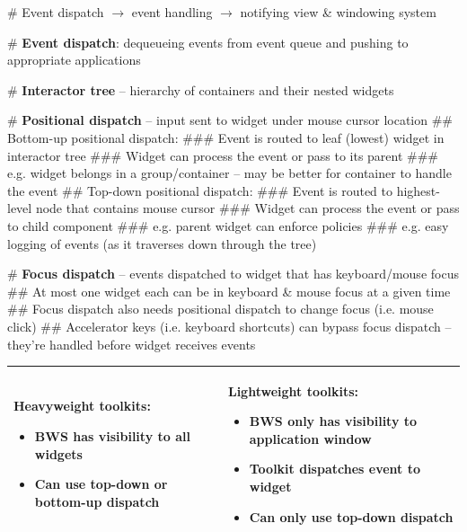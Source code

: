 \documentclass[11pt, oneside]{article}
\newenvironment{itemized}{\begin{itemize}[noitemsep, topsep=0pt, leftmargin=*]}{\end{itemize}}  %
\begin{document}
# Event dispatch $\rightarrow$ event handling $\rightarrow$ notifying view \& windowing system

# \textbf{Event dispatch}: dequeueing events from event queue and pushing to appropriate applications

# \textbf{Interactor tree} -- hierarchy of containers and their nested widgets

# \textbf{Positional dispatch} -- input sent to widget under mouse cursor location
## Bottom-up positional dispatch:
### Event is routed to leaf (lowest) widget in interactor tree
### Widget can process the event or pass to its parent
### e.g. widget belongs in a group/container -- may be better for container to handle the event
## Top-down positional dispatch:
### Event is routed to highest-level node that contains mouse cursor
### Widget can process the event or pass to child component
### e.g. parent widget can enforce policies
### e.g. easy logging of events (as it traverses down through the tree)

# \textbf{Focus dispatch} -- events dispatched to widget that has keyboard/mouse focus
## At most one widget each can be in keyboard \& mouse focus at a given time
## Focus dispatch also needs positional dispatch to change focus (i.e. mouse click)
## Accelerator keys (i.e. keyboard shortcuts) can bypass focus dispatch -- they're handled before widget receives events

\hspace{-2em}
\begin{tabular}{|l|l|}
\hline
\begin{minipage}[t]{0.45\textwidth}
\textbf{Heavyweight toolkits}:
    \begin{itemized}
    \item BWS has visibility to all widgets
    \item Can use top-down or bottom-up dispatch
    \end{itemized}
    \vspace*{0.5em}
\end{minipage}
&
\begin{minipage}[t]{0.45\textwidth}
\textbf{Lightweight toolkits}:
    \begin{itemized}
    \item BWS only has visibility to application window
    \item Toolkit dispatches event to widget
    \item Can only use top-down dispatch
    \end{itemized}
    \vspace*{0.5em}
\end{minipage}  \\
\hline
\end{tabular} \\
\end{document}
